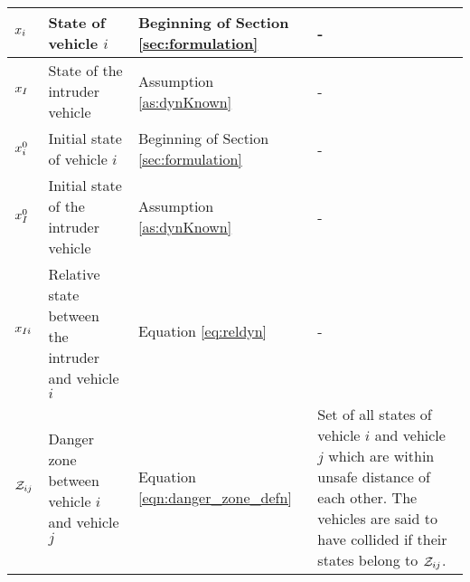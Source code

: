 \begin{table*}
{\begin{tabular}{ |>{\centering\arraybackslash}m{1.2cm}| m{5.2cm} | m{2.8cm} | m{0.3cm + \columnwidth} |}
    $x_i$ & State of vehicle $i$ & Beginning of Section \ref{sec:formulation} & - \\ \hline
    $x_{I}$ & State of the intruder vehicle & Assumption \ref{as:dynKnown} & - \\ \hline
    $x_i^0$ & Initial state of vehicle $i$ & Beginning of Section \ref{sec:formulation} & - \\ \hline
    $x_{I}^0$ & Initial state of the intruder vehicle & Assumption \ref{as:dynKnown} & - \\ \hline
    $x_{I i}$ & Relative state between the intruder and vehicle $i$ & Equation \eqref{eq:reldyn} & - \\ \hline
    
    $\mathcal{Z}_{ij}$ & Danger zone between vehicle $i$ and vehicle $j$ & Equation \eqref{eqn:danger_zone_defn} & Set of all states of vehicle $i$ and vehicle $j$ which are within unsafe distance of each other. The vehicles are said to have collided if their states belong to $\mathcal{Z}_{ij}$. \\ \hline
    \end{tabular} }
    \label{table:notation}
\end{table*}